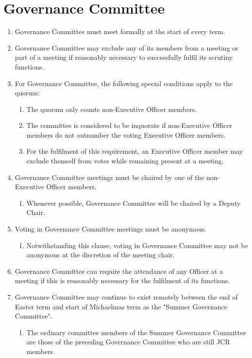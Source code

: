 \documentclass[12pt]{article}
\begin{document}
\section{Governance Committee}
\begin{enumerate}
    \item Governance Committee must meet formally at the start of every term.
    \item Governance Committee may exclude any of its members from a meeting or part of a meeting if reasonably necessary to successfully fulfil its scrutiny functions.
    \item For Governance Committee, the following special conditions apply to the quorum:
    \begin{enumerate}
        \item The quorum only counts non-Executive Officer members.
        \item The committee is considered to be inquorate if non-Executive Officer members do not outnumber the voting Executive Officer members.
        \item For the fulfilment of this requirement, an Executive Officer member may exclude themself from votes while remaining present at a meeting.
    \end{enumerate}
    \item Governance Committee meetings must be chaired by one of the non-Executive Officer members.
    \begin{enumerate}
        \item Whenever possible, Governance Committee will be chaired by a Deputy Chair.
    \end{enumerate}
    \item Voting in Governance Committee meetings must be anonymous.
    \begin{enumerate}
        \item Notwithstanding this clause, voting in Governance Committee may not be anonymous at the discretion of the meeting chair.
    \end{enumerate}
    \item Governance Committee can require the attendance of any Officer at a meeting if this is reasonably necessary for the fulfilment of its functions.
    \item Governance Committee may continue to exist remotely between the end of Easter term and start of Michaelmas term as the "Summer Governance Committee".
    \begin{enumerate}
        \item The ordinary committee members of the Summer Governance Committee are those of the preceding Governance Committee who are still JCR members.

\end{enumerate}
\end{enumerate}
\end{document}
